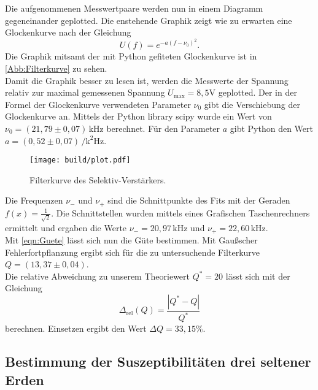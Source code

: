 Die aufgenommenen Messwertpaare werden nun in einem Diagramm gegeneinander geplotted. Die 
enstehende Graphik zeigt wie zu erwarten eine Glockenkurve nach der Gleichung
\begin{equation*}
  U(f) = e^{-a(f-\nu_0)^2}.
\end{equation*}
Die Graphik mitsamt der mit Python gefiteten Glockenkurve ist in \autoref{Abb:Filterkurve} zu sehen.\\
Damit die Graphik besser zu lesen ist, werden die Messwerte der Spannung relativ zur 
maximal gemessenen Spannung $U_{\mathrm{max}} = 8,5 \si{\volt}$ geplotted. Der in der Formel
der Glockenkurve verwendeten Parameter $\nu_0$ gibt die Verschiebung der Glockenkurve an.
Mittels der Python library scipy wurde ein Wert von $\nu_0 = (21,79 \pm 0,07) \, \si{\kilo\hertz} $
berechnet. Für den Parameter $a$ gibt Python den Wert 
$a = (0,52 \pm 0,07 ) \, \si{\per\square\kilo\hertz}$.\\
\begin{figure}
  \centering
  \texttt{[image: build/plot.pdf]}
  \caption{Filterkurve des Selektiv-Verstärkers.}
  \label{Abb:Filterkurve}
\end{figure}
Die Frequenzen $\nu_{-}$ und $\nu_{+}$ sind die Schnittpunkte des Fits mit der Geraden
$f(x) = \frac{1}{\sqrt{2}}$. Die Schnittstellen wurden mittels eines Grafischen Taschenrechners
ermittelt und ergaben die Werte $\nu_{-} = 20,97 \, \si{\kilo\hertz}$ und $\nu_{+} = 22,60 \, \si{\kilo\hertz}$.\\
Mit \autoref{eqn:Guete} lässt sich nun die Güte bestimmen. Mit Gaußscher Fehlerfortpflanzung ergibt sich
für die zu untersuchende Filterkurve $Q = (13,37 \pm 0,04)$.\\
Die relative Abweichung zu unserem Theoriewert $Q^* = 20$ lässt sich mit der Gleichung
\begin{equation*}
    \Delta_{\mathrm{rel}}(Q) = \frac{|Q^* - Q|}{Q^*}
\end{equation*}
berechnen. Einsetzen ergibt den Wert $\Delta Q = 33,15 \%$.\\

\subsection{Bestimmung der Suszeptibilitäten drei seltener Erden}

